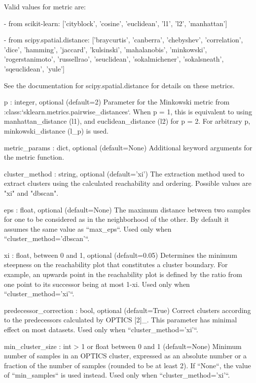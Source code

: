 \begin{DoxyVerb}
    Valid values for metric are:

    - from scikit-learn: ['cityblock', 'cosine', 'euclidean', 'l1', 'l2',
      'manhattan']

    - from scipy.spatial.distance: ['braycurtis', 'canberra', 'chebyshev',
      'correlation', 'dice', 'hamming', 'jaccard', 'kulsinski',
      'mahalanobis', 'minkowski', 'rogerstanimoto', 'russellrao',
      'seuclidean', 'sokalmichener', 'sokalsneath', 'sqeuclidean',
      'yule']

    See the documentation for scipy.spatial.distance for details on these
    metrics.

p : integer, optional (default=2)
    Parameter for the Minkowski metric from
    :class:`sklearn.metrics.pairwise_distances`. When p = 1, this is
    equivalent to using manhattan_distance (l1), and euclidean_distance
    (l2) for p = 2. For arbitrary p, minkowski_distance (l_p) is used.

metric_params : dict, optional (default=None)
    Additional keyword arguments for the metric function.

cluster_method : string, optional (default='xi')
    The extraction method used to extract clusters using the calculated
    reachability and ordering. Possible values are "xi" and "dbscan".

eps : float, optional (default=None)
    The maximum distance between two samples for one to be considered as
    in the neighborhood of the other. By default it assumes the same value
    as ``max_eps``.
    Used only when ``cluster_method='dbscan'``.

xi : float, between 0 and 1, optional (default=0.05)
    Determines the minimum steepness on the reachability plot that
    constitutes a cluster boundary. For example, an upwards point in the
    reachability plot is defined by the ratio from one point to its
    successor being at most 1-xi.
    Used only when ``cluster_method='xi'``.

predecessor_correction : bool, optional (default=True)
    Correct clusters according to the predecessors calculated by OPTICS
    [2]_. This parameter has minimal effect on most datasets.
    Used only when ``cluster_method='xi'``.

min_cluster_size : int > 1 or float between 0 and 1 (default=None)
    Minimum number of samples in an OPTICS cluster, expressed as an
    absolute number or a fraction of the number of samples (rounded to be
    at least 2). If ``None``, the value of ``min_samples`` is used instead.
    Used only when ``cluster_method='xi'``.


\end{DoxyVerb}
